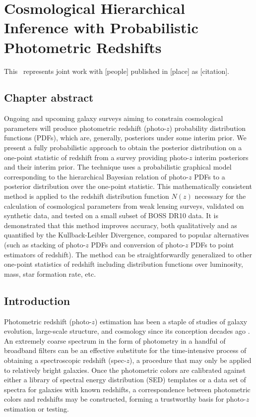 \renewcommand{\chapid}{chippr}

\newcommand{\thisplain}{chippr}
\newcommand{\github}{\project{GitHub}}


\chapter{Cosmological Hierarchical Inference with Probabilistic Photometric Redshifts}

This \paper\ represents joint work with [people] published in [place] as [citation].

\section{Chapter abstract}

Ongoing and upcoming galaxy surveys aiming to constrain cosmological parameters will produce photometric redshift (photo-$z$) probability distribution functions (PDFs), which are, generally, posteriors under some interim prior.  
We present a fully probabilistic approach to obtain the posterior distribution on a one-point statistic of redshift from a survey providing photo-$z$ interim posteriors and their interim prior.  
The technique uses a probabilistic graphical model corresponding to the hierarchical Bayesian relation of photo-$z$ PDFs to a posterior distribution over the one-point statistic.  
This mathematically consistent method is applied to the redshift distribution function $N(z)$ necessary for the calculation of cosmological parameters from weak lensing surveys, validated on synthetic data, and tested on a small subset of BOSS DR10 data.  
It is demonstrated that this method improves accuracy, both qualitatively and as quantified by the Kullback-Leibler Divergence, compared to popular alternatives (such as stacking of photo-$z$ PDFs and conversion of photo-$z$ PDFs to point estimators of redshift).  
The method can be straightforwardly generalized to other one-point statistics of redshift including distribution functions over luminosity, mass, star formation rate, etc.

\section{Introduction}

Photometric redshift (photo-$z$) estimation has been a staple of studies of galaxy evolution, large-scale structure, and cosmology since its conception decades ago \citep{Baum1962}.  
An extremely coarse spectrum in the form of photometry in a handful of broadband filters can be an effective substitute for the time-intensive process of obtaining a spectroscopic redshift (spec-$z$), a procedure that may only be applied to relatively bright galaxies.  
Once the photometric colors are calibrated against either a library of spectral energy distribution (SED) templates or a data set of spectra for galaxies with known redshifts, a correspondence between photometric colors and redshifts may be constructed, forming a trustworthy basis for photo-$z$ estimation or testing.

